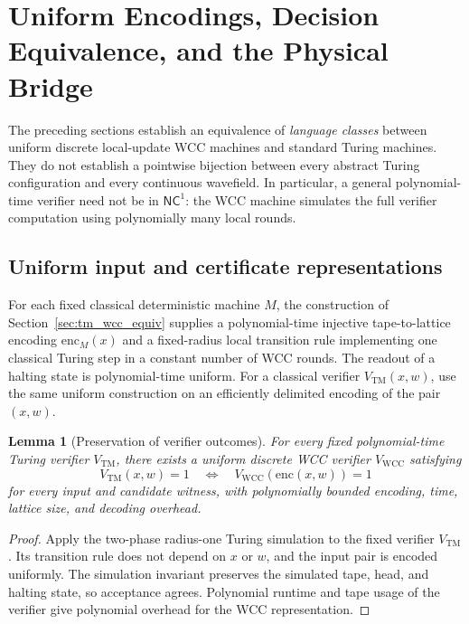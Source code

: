 \documentclass[12pt]{article}
\newcommand{\TM}{\mathrm{TM}}
\newcommand{\WCC}{\mathrm{WCC}}
\newcommand{\enc}{\mathrm{enc}}
\newcommand{\NC}{\mathsf{NC}}
\newtheorem{lemma}[theorem]{Lemma}
\begin{document}
\section{Uniform Encodings, Decision Equivalence, and the Physical Bridge}
\label{sec:uniform-bridge}
\label{sec:bijection}

The preceding sections establish an equivalence of \emph{language classes}
between uniform discrete local-update WCC machines and standard Turing
machines. They do not establish a pointwise bijection between every
abstract Turing configuration and every continuous wavefield.
In particular, a general polynomial-time verifier need not be in
$\NC^1$: the WCC machine simulates the full verifier computation
using polynomially many local rounds.

\subsection{Uniform input and certificate representations}
For each fixed classical deterministic machine $M$, the construction
of Section~\ref{sec:tm_wcc_equiv} supplies a polynomial-time
injective tape-to-lattice encoding $\enc_M(x)$ and a fixed-radius
local transition rule implementing one classical Turing step in a
constant number of WCC rounds. The readout of a halting state is
polynomial-time uniform. For a classical verifier $V_{\TM}(x,w)$, use
the same uniform construction on an efficiently delimited encoding
of the pair $(x,w)$.

\begin{lemma}[Preservation of verifier outcomes]
\label{lem:verifier-encoding}
For every fixed polynomial-time Turing verifier $V_{\TM}$, there
exists a uniform discrete WCC verifier $V_{\WCC}$ satisfying
\[
V_{\TM}(x,w)=1\quad\Longleftrightarrow\quad
V_{\WCC}(\enc(x,w))=1
\]
for every input and candidate witness, with polynomially bounded
encoding, time, lattice size, and decoding overhead.
\end{lemma}
\begin{proof}
Apply the two-phase radius-one Turing simulation to the fixed
verifier $V_{\TM}$. Its transition rule does not depend on $x$ or
$w$, and the input pair is encoded uniformly. The simulation
invariant preserves the simulated tape, head, and halting state,
so acceptance agrees. Polynomial runtime and tape usage of the
verifier give polynomial overhead for the WCC representation.
\end{proof}
\end{document}
